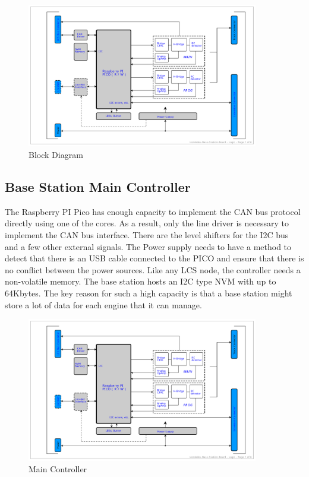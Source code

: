 \begin{figure}[htbp]
    \centering
    \includegraphics[page=1, width=0.9\textwidth]{./Schematics/Schematic_LcsNodes-Base-Station-Board.pdf}
    \caption{Block Diagram}
\end{figure}
\FloatBarrier

\subsection{Base Station Main Controller}

The Raspberry PI Pico has enough capacity to implement the CAN bus protocol directly using one of the cores. As a result, only the line driver is necessary to implement the CAN bus interface. There are the level shifters for the I2C bus and a few other external signals. The Power supply needs to have a method to detect that there is an USB cable connected to the PICO and ensure that there is no conflict between the power sources. Like any LCS node, the controller needs a non-volatile memory. The base station hosts an I2C type NVM with up to 64Kbytes. The key reason for such a high capacity is that a base station might store a lot of data for each engine that it can manage.

\begin{figure}[htbp]
    \centering
    \includegraphics[page=2, width=0.9\textwidth]{./Schematics/Schematic_LcsNodes-Base-Station-Board.pdf}
    \caption{Main Controller}
\end{figure}
\FloatBarrier


